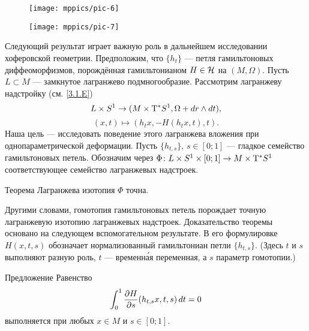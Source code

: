 \begin{figure}[ht!]
\begin{minipage}{.48\textwidth}
\centering
\texttt{[image: mppics/pic-6]}
\end{minipage}\hfill
\begin{minipage}{.48\textwidth}
\centering
\texttt{[image: mppics/pic-7]}
\end{minipage}

\medskip

\begin{minipage}{.48\textwidth}
\centering
\caption{}\label{pic-6}
\end{minipage}\hfill
\begin{minipage}{.48\textwidth}
\centering
\caption{}\label{pic-7}
\end{minipage}
\vskip-4mm
\end{figure}

Следующий результат играет важную роль в дальнейшем исследовании хоферовской геометрии.
Предположим, что $\{h_t\}$ — петля гамильтоновых диффеоморфизмов, порождённая гамильтонианом $H \in \mathcal{H}$ на $(M, \Omega)$.
Пусть $L \subset M$ — замкнутое лагранжево подмногообразие.
Рассмотрим лагранжеву надстройку (см. \ref{3.1.E})
\[L \times S^1 \to (M \times \mathrm{T}^\ast S^1, \Omega + d r \wedge d t),\]
\[(x, t) \mapsto (h_t x, -H (h_t x, t), t).\]
Наша цель — исследовать поведение этого лагранжева вложения при однопараметрической деформации.
Пусть $\{h_{t, s}\}$, $s \in [0; 1]$ — гладкое семейство гамильтоновых петель.
Обозначим через $\Phi\: L \z\times S^1 \z\times [0; 1] \z\to M \z\times \T^\ast S^1$ соответствующее семейство лагранжевых надстроек.

\begin{thm}{Теорема}\label{6.1.B}
Лагранжева изотопия $\Phi$ точна.
\end{thm}

Другими словами, гомотопия гамильтоновых петель порождает точную
лагранжевую изотопию лагранжевых надстроек. 
Доказательство теоремы основано на следующем вспомогательном результате.
В его формулировке $H (x, t, s)$ обозначает нормализованный
гамильтониан петли $\{h_{t, s}\}$.
(Здесь $t$ и $s$ выполняют разную роль, $t$ — временн\'{а}я переменная, а $s$ параметр гомотопии.)

\begin{thm}{Предложение}\label{6.1.C}
Равенство 
\[\int_0^1 \frac{\partial H}{\partial s} (h_{t, s} x, t, s)\,d t = 0\]
выполняется при любых $x \in M$ и $s \in [0; 1]$.
\end{thm}

